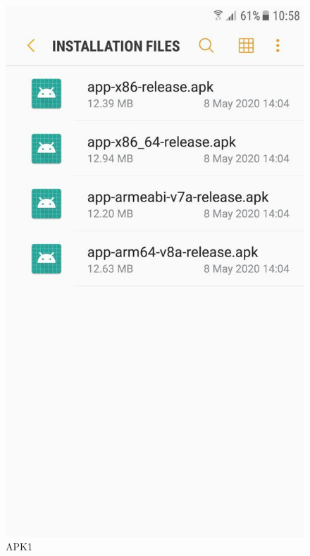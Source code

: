 \begin{figure}[h!]
\begin{minipage}[t]{0.48\textwidth}
\includegraphics[width=\linewidth,keepaspectratio=true]{img/apk1.jpg}
\caption{APK1}
\label{fig:APK1}
\end{minipage}
\hspace*{\fill} %
\begin{minipage}[t]{0.48\textwidth}

\end{minipage}
\end{figure}
